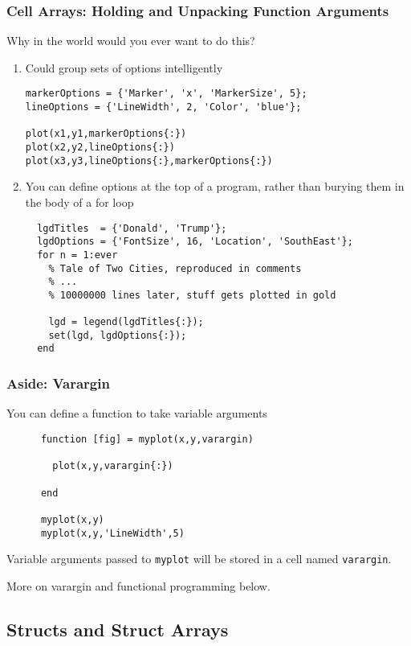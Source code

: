\documentclass{beamer}
\begin{document}
  \begin{frame}[fragile]
    \frametitle{Cell Arrays: Holding and Unpacking Function Arguments}

    Why in the world would you ever want to do this?
    \begin{enumerate}
      \item Could group sets of options intelligently
\begin{lstlisting}
markerOptions = {'Marker', 'x', 'MarkerSize', 5};
lineOptions = {'LineWidth', 2, 'Color', 'blue'};

plot(x1,y1,markerOptions{:})
plot(x2,y2,lineOptions{:})
plot(x3,y3,lineOptions{:},markerOptions{:})
\end{lstlisting}\pause
      \item You can define options at the top of a program, rather than
        burying them in the body of a for loop
\begin{lstlisting}
  lgdTitles  = {'Donald', 'Trump'};
  lgdOptions = {'FontSize', 16, 'Location', 'SouthEast'};
  for n = 1:ever
    % Tale of Two Cities, reproduced in comments
    % ...
    % 10000000 lines later, stuff gets plotted in gold

    lgd = legend(lgdTitles{:});
    set(lgd, lgdOptions{:});
  end
\end{lstlisting}
    \end{enumerate}

	\end{frame}


  \begin{frame}[fragile]
    \frametitle{Aside: Varargin}

    You can define a function to take variable arguments
    \begin{lstlisting}
      function [fig] = myplot(x,y,varargin)

        plot(x,y,varargin{:})

      end

      myplot(x,y)
      myplot(x,y,'LineWidth',5)
    \end{lstlisting}
    Variable arguments passed to \texttt{myplot} will be stored in a
    cell named \texttt{varargin}.

    \vspace{10pt}
    More on varargin and functional programming below.
	\end{frame}

\subsection{Structs and Struct Arrays}
\end{document}
